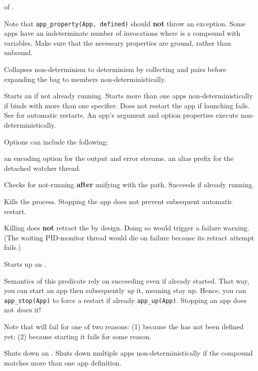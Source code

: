 \begin{description}
 of .

Note that \verb$app_property(App, defined)$ should \textbf{not} throw an
exception. Some apps have an indeterminate number of invocations
where  is a compound with variables. Make sure that the necessary
properties are ground, rather than unbound.

Collapses non-determinism to determinism by collecting  and
 pairs before expanding the bag to members
non-deterministically.

Starts an  if not already running. Starts more than one apps
non-deterministically if  binds with more than one specifier.
Does not restart the app if launching fails. See  for
automatic restarts. An app's argument and option properties execute
non-deterministically.

Options can include the following:

\begin{description}
an encoding option for the output and error streams.
an alias prefix for the detached watcher thread.
\end{description}

Checks for not-running \textbf{after} unifying with the  path. Succeeds
if already running.

Kills the  process. Stopping the app does not prevent subsequent
automatic restart.

Killing does \textbf{not} retract the  by design. Doing so would
trigger a failure warning. (The waiting PID-monitor thread would die
on failure because its retract attempt fails.)

Starts up an .

Semantics of this predicate rely on  succeeding even if
already started. That way, you can start an app then subsequently
\textit{up} it, meaning stay up. Hence, you can \verb$app_stop(App)$ to force a
restart if already \verb$app_up(App)$. Stopping an app does not \textit{down} it!

Note that  will fail for one of two reasons: (1) because
the  has not been defined yet; (2) because starting it fails for
some reason.

Shuts down an . Shuts down multiple apps non-deterministically if
the  compound matches more than one app definition.
\end{description}

